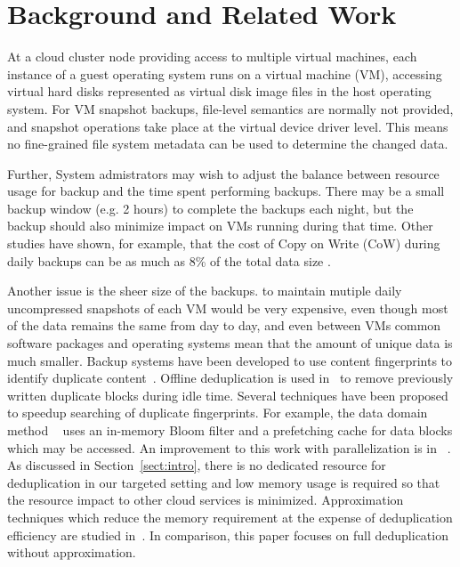 
\section{Background and Related Work}
\label{sect:background}


At a cloud cluster node providing access to multiple virtual machines, each
instance of a guest operating system runs on a virtual machine (VM), accessing
virtual hard disks represented as virtual disk image files in the host
operating system. For VM snapshot backups, file-level semantics are normally
not provided, and snapshot operations take place at the virtual device driver
level.  This means no fine-grained file system metadata can be used to
determine the changed data.

Further, System admistrators may wish to adjust the balance between resource 
usage for backup and the time spent performing backups. There may be a small
backup window (e.g. 2 hours) to complete the backups each night, but the backup
should also minimize impact on VMs running during that time. Other studies have
shown, for example, that the cost of Copy on Write (CoW) during daily backups
can be as much as 8\% of the total data size \cite{EMCIncrementalDataChanges}.

Another issue is the sheer size of the backups. to maintain mutiple daily
uncompressed snapshots of each VM would be very expensive, even though
most of the data remains the same from day to day, and even between VMs common
software packages and operating systems mean that the amount of unique data is
much smaller. Backup systems have been developed to use content fingerprints to
identify duplicate content~\cite{venti02,Rhea2008}. Offline deduplication is
used in~\cite{EMC,NetAppOffline} to remove previously written duplicate blocks
during idle time.  Several techniques have been proposed to speedup searching
of duplicate fingerprints. For example, the data domain method
~\cite{bottleneck08} uses  an in-memory Bloom filter and a prefetching cache
for data blocks  which may be accessed.  An improvement to this work with
parallelization is in ~\cite{MAD210,DEBAR}.  As discussed in
Section~\ref{sect:intro}, there is no dedicated resource for deduplication in
our targeted setting and low memory usage is required so that the resource
impact to other cloud services is minimized. Approximation techniques which
reduce the memory requirement at the expense of deduplication efficiency are
studied in~\cite{extreme_binning09,Guo2011,WeiZhangIEEE}.  In comparison, this
paper focuses on full deduplication without approximation.

